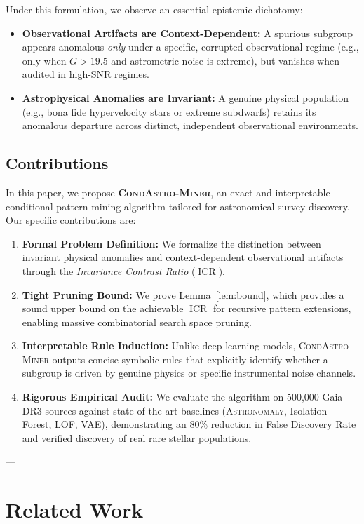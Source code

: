 \documentclass[10pt,a4paper]{article}
\begin{document}
Under this formulation, we observe an essential epistemic dichotomy:
\begin{itemize}
    \item \textbf{Observational Artifacts are Context-Dependent:} A spurious subgroup appears anomalous \textit{only} under a specific, corrupted observational regime (e.g., only when $G > 19.5$ and astrometric noise is extreme), but vanishes when audited in high-SNR regimes.
    \item \textbf{Astrophysical Anomalies are Invariant:} A genuine physical population (e.g., bona fide hypervelocity stars or extreme subdwarfs) retains its anomalous departure across distinct, independent observational environments.
\end{itemize}

\subsection{Contributions}
In this paper, we propose \textbf{\textsc{CondAstro-Miner}}, an exact and interpretable conditional pattern mining algorithm tailored for astronomical survey discovery. Our specific contributions are:
\begin{enumerate}
    \item \textbf{Formal Problem Definition:} We formalize the distinction between invariant physical anomalies and context-dependent observational artifacts through the \textit{Invariance Contrast Ratio} ($\operatorname{ICR}$).
    \item \textbf{Tight Pruning Bound:} We prove Lemma~\ref{lem:bound}, which provides a sound upper bound on the achievable $\operatorname{ICR}$ for recursive pattern extensions, enabling massive combinatorial search space pruning.
    \item \textbf{Interpretable Rule Induction:} Unlike deep learning models, \textsc{CondAstro-Miner} outputs concise symbolic rules that explicitly identify whether a subgroup is driven by genuine physics or specific instrumental noise channels.
    \item \textbf{Rigorous Empirical Audit:} We evaluate the algorithm on 500,000 Gaia DR3 sources against state-of-the-art baselines (\textsc{Astronomaly}, Isolation Forest, LOF, VAE), demonstrating an 80\% reduction in False Discovery Rate and verified discovery of real rare stellar populations.
\end{enumerate}

---

\section{Related Work}
\label{sec:related}
\end{document}
